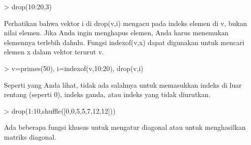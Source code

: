 \documentclass[a4paper,10pt]{article}
\begin{document}
\begin{eulernotebook}
\begin{eulercomment}
\begin{eulercomment}
\begin{eulercomment}
\begin{eulercomment}
\begin{eulercomment}
\begin{eulercomment}
\begin{eulerprompt}
> drop(10:20,3)
\end{eulerprompt}
\begin{euleroutput}
  [10,  11,  13,  14,  15,  16,  17,  18,  19,  20]
\end{euleroutput}
\begin{eulercomment}
Perhatikan bahwa vektor i di drop(v,i) mengacu pada indeks elemen di
v, bukan nilai elemen. Jika Anda ingin menghapus elemen, Anda harus
menemukan elemennya terlebih dahulu. Fungsi indexof(v,x) dapat
digunakan untuk mencari elemen x dalam vektor terurut v.
\end{eulercomment}
\begin{eulerprompt}
> v=primes(50), i=indexof(v,10:20), drop(v,i)
\end{eulerprompt}
\begin{euleroutput}
  [2,  3,  5,  7,  11,  13,  17,  19,  23,  29,  31,  37,  41,  43,  47]
  [0,  5,  0,  6,  0,  0,  0,  7,  0,  8,  0]
  [2,  3,  5,  7,  23,  29,  31,  37,  41,  43,  47]
\end{euleroutput}
\begin{eulercomment}
Seperti yang Anda lihat, tidak ada salahnya untuk memasukkan indeks di
luar rentang (seperti 0), indeks ganda, atau indeks yang tidak
diurutkan.
\end{eulercomment}
\begin{eulerprompt}
> drop(1:10,shuffle([0,0,5,5,7,12,12]))
\end{eulerprompt}
\begin{euleroutput}
  [1,  2,  3,  4,  6,  8,  9,  10]
\end{euleroutput}
\begin{eulercomment}
Ada beberapa fungsi khusus untuk mengatur diagonal atau untuk
menghasilkan matriks diagonal.


\end{eulercomment}
\end{eulercomment}
\end{eulercomment}
\end{eulercomment}
\end{eulercomment}
\end{eulercomment}
\end{eulercomment}
\end{eulernotebook}
\end{document}
